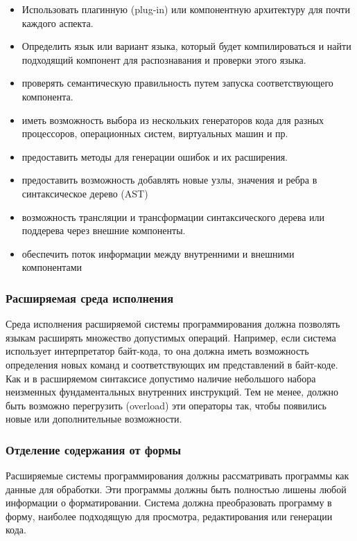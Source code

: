 \documentclass[a4paper,12pt]{article}
\begin{document}
\begin{itemize}
  \item Использовать плагинную (plug-in) или компонентную архитектуру для почти
  каждого аспекта.
  \item Определить язык или вариант языка, который будет компилироваться и
  найти подходящий компонент для распознавания и проверки этого языка.
  \item проверять семантическую правильность путем запуска соответствующего
  компонента.
  \item иметь возможность выбора из нескольких генераторов кода для разных
  процессоров, операционных систем, виртуальных машин и пр.
  \item предоставить методы для генерации ошибок и их расширения.
  \item предоставить возможность добавлять новые узлы, значения и ребра в
  синтаксическое дерево (AST)
  \item возможность трансляции и трансформации синтаксического дерева или
  поддерева через внешние компоненты.
  \item обеспечить поток информации между внутренними и внешними компонентами
\end{itemize}

\subsubsection{Расширяемая среда исполнения}
Среда исполнения расширяемой системы программирования должна позволять языкам
расширять множество допустимых операций. Например, если система использует
интерпретатор байт-кода, то она должна иметь возможность определения новых
команд и соответствующих им представлений в байт-коде. Как и в расширяемом
синтаксисе допустимо наличие небольшого набора неизменных фундаментальных
внутренних инструкций. Тем не менее, должно быть возможно перегрузить
(overload) эти операторы так, чтобы появились новые или дополнительные
возможности.

\subsubsection{Отделение содержания от формы}
Расширяемые системы программирования должны рассматривать программы как данные
для обработки. Эти программы должны быть полностью лишены любой информации о
форматировании. Система должна преобразовать программу в форму, наиболее
подходящую для просмотра, редактирования или генерации кода.
\end{document}
